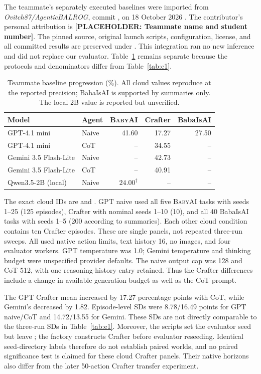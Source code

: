 \documentclass[11pt,a4paper]{article}
\newcommand{\missing}[1]{\textbf{[PLACEHOLDER: #1]}}
\newcommand{\BabyAI}{\textsc{BabyAI}}
\begin{document}
The teammate's separately executed baselines were imported from \emph{Ovitch87/AgenticBALROG}, commit , on 18 October 2026 \cite{teammate}. The contributor's personal attribution is \missing{Teammate name and student number}. The pinned source, original launch scripts, configuration, license, and all committed results are preserved under . This integration ran no new inference and did not replace our evaluator. Table~\ref{tab:cloud} remains separate because the protocols and denominators differ from Table~\ref{tab:e1}.

\begin{table}[htbp]
\centering
\caption{Teammate baseline progression (\%). All cloud values reproduce at the reported precision; BabaIsAI is supported by summaries only. The local 2B value is reported but unverified.}
\label{tab:cloud}
\small
\begin{tabular}{@{}llrrr@{}}
\toprule
Model & Agent & \BabyAI{} & Crafter & BabaIsAI \\
\midrule
GPT-4.1 mini & Naive & 41.60 & 17.27 & 27.50 \\
GPT-4.1 mini & CoT & -- & 34.55 & -- \\
Gemini 3.5 Flash-Lite & Naive & -- & 42.73 & -- \\
Gemini 3.5 Flash-Lite & CoT & -- & 40.91 & -- \\
Qwen3.5-2B (local) & Naive & $24.00^{\dagger}$ & -- & -- \\
\bottomrule
\end{tabular}
\end{table}

The exact cloud IDs are  and . GPT naive used all five \BabyAI{} tasks with seeds 1--25 (125 episodes), Crafter with nominal seeds 1--10 (10), and all 40 BabaIsAI tasks with seeds 1--5 (200 according to summaries). Each other cloud condition contains ten Crafter episodes. These are single panels, not repeated three-run sweeps. All used native action limits, text history 16, no images, and four evaluator workers. GPT temperature was 1.0; Gemini temperature and thinking budget were unspecified provider defaults. The naive output cap was 128 and CoT 512, with one reasoning-history entry retained. Thus the Crafter differences include a change in available generation budget as well as the CoT prompt.

The GPT Crafter mean increased by 17.27 percentage points with CoT, while Gemini's decreased by 1.82. Episode-level SDs were 8.78/16.49 points for GPT naive/CoT and 14.72/13.55 for Gemini. These SDs are not directly comparable to the three-run SDs in Table~\ref{tab:e1}. Moreover, the scripts set the evaluator seed but leave ; the factory constructs Crafter before evaluator reseeding. Identical seed-directory labels therefore do not establish paired worlds, and no paired significance test is claimed for these cloud Crafter panels. Their native horizons also differ from the later 50-action Crafter transfer experiment.
\end{document}
